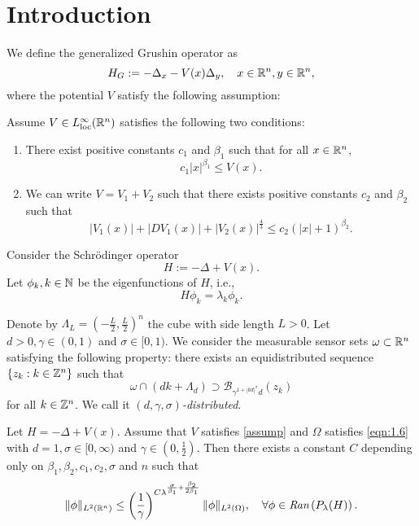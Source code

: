 \tableofcontents
\section{Introduction}
We define the generalized Grushin operator as
\begin{equation}
	H_G:=-\Delta_x - V(x)\Delta _y,\quad x\in \mathbb{R}^{n},y\in \mathbb{R}^{n},
\end{equation}
where the potential $V$ satisfy the following assumption:
\begin{assumption}\label{assump}
Assume $V\in L_{\mathrm{loc}}^{\infty}(\mathbb{R}^{n})$ satisfies the following	two conditions:
\begin{enumerate}
	\item There exist positive constants $c_1$ and $\beta_1$ such that for all $x\in \mathbb{R}^{n}$,
		\begin{equation}
			c_1 |x|^{\beta_1}\le V(x).
		\end{equation}
	\item We can write $V=V_1+V_2$ such that there exists positive constants $c_2$ and $\beta_2$ such that 
		\begin{equation}
			|V_1(x)|+|DV_1(x)|+|V_2(x)|^{\frac{4}{3}}\le c_2(|x|+1)^{\beta_2}.
		\end{equation}
\end{enumerate}
Consider the Schrödinger operator
\begin{equation}
	H:=-\Delta+V(x).
\end{equation}
Let $\phi_k,k\in \mathbb{N}$ be the eigenfunctions of $H$, i.e.,
 \begin{equation}
	H \phi_k=\lambda_k \phi_k.
\end{equation}

\end{assumption}

Denote by $\Lambda_L=\left( - \frac{L}{2},\frac{L}{2} \right)^{n} $ the cube with side length $L>0$. Let $d>0, \gamma\in (0,1)$ and $\sigma \in [0,1)$. We consider the measurable sensor sets $\omega \subset  \mathbb{R}^{n}$ satisfying the following property: there exists an equidistributed sequence $\left\{z_k:k\in \mathbb{Z}^{n}\right\} $ such that
\begin{equation}\label{eqn:1.6}
	\omega \cap (dk+\Lambda_d)\supset \mathcal{B}_{\gamma^{1+|kd|^{\sigma}}d}(z_k)
\end{equation}
for all $k\in \mathbb{Z}^{n}$. We call it \textit{$(d,\gamma,\sigma)$-distributed}. 

\begin{theorem}
	Let $H=-\Delta +V(x)$. Assume that $V$ satisfies \cref{assump} and $\Omega$ satisfies \eqref{eqn:1.6} with $d=1,\sigma \in [0,\infty)$ and $\gamma \in  (0,\frac{1}{2})$. Then there exists a constant $C$ depending only on $\beta_1,\beta_2,c_1,c_2,\sigma$ and $n$ such that 
	\begin{equation}
		\|\phi\|_{L^2(\mathbb{R}^{n})}\le \left( \frac{1}{\gamma} \right) ^{C\lambda^{\frac{\sigma}{\beta_1}+\frac{\beta_2}{2\beta_1}}}\|\phi\|_{L^2(\Omega)},\quad \forall \phi \in \textit{Ran} \left( P_\lambda (H) \right). 
	\end{equation}
\end{theorem}



